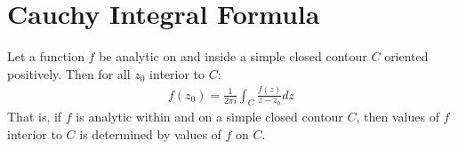 \documentclass[12pt, english]{book}
\begin{document}
	\section{Cauchy Integral Formula} \label{Cauchy Integral Formula Section - Complex}
	
	\begin{theorem}
		\label{Cauchy Integral Formula}
		Let a function \(f\) be analytic on and inside a simple closed contour \(C\) oriented positively. Then for all \(z_0\) interior to \(C\):
		\begin{align*}
			f(z_0) = \frac{1}{2\pi i} \int_{C} \frac{f(z)}{z - z_0} dz
		\end{align*}
		That is, if \(f\) is analytic within and on a simple closed contour \(C\), then values of \(f\) interior to \(C\) is determined by values of \(f\) on \(C\).
	\end{theorem}
\end{document}
